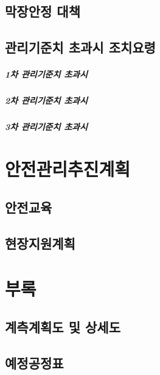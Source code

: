 \documentclass[12pt, a4paper, oneside]{book}
\let\stdsection\section
\renewcommand\section{\newpage\stdsection}
\begin{document}
	\section{막장안정 대책}
	
	\section{관리기준치 초과시 조치요령}

		\paragraph{1차 관리기준치 초과시}
	
		\paragraph{2차 관리기준치 초과시}

		\paragraph{3차 관리기준치 초과시}

	\chapter{안전관리추진계획}
	\minitoc				%
	
	\section{안전교육}
	
	\section{현장지원계획}


	\chapter{부록}
	\minitoc				%

	\section{계측계획도 및 상세도}

	\section{예정공정표}
	





\end{document}
